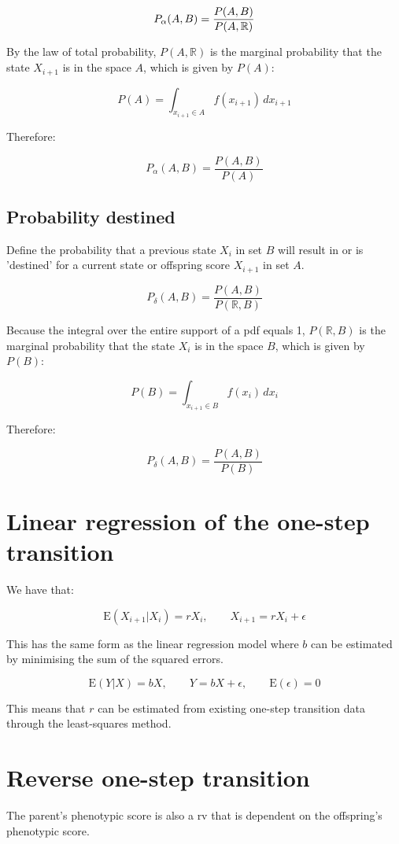 \documentclass[a4paper,11pt]{article}
\begin{document}
$$\large P_{\alpha}(A, B) = \frac{P(A, B)}{P(A, \mathbb{R})}$$

By the law of total probability, $P(A, \mathbb{R})$ is the marginal probability that the state $X_{i+1}$ is in the space $A$, which is given by $P(A)$:

$$P(A) = \int_{x_{i+1}\in A} f(x_{i+1}) \, dx_{i+1}$$

Therefore:

$$P_{\alpha}(A, B) = \frac{P(A, B)}{P(A)}$$




\subsection{Probability destined}
Define the probability that a previous state $X_i$ in set $B$ will result in or is 'destined' for a current state or offspring score $X_{i+1}$ in set $A$. 

$$P_{\delta}(A, B) = \frac{P(A, B)}{P(\mathbb{R}, B)}$$

Because the integral over the entire support of a pdf equals 1, $P(\mathbb{R}, B)$ is the marginal probability that the state $X_i$ is in the space $B$, which is given by $P(B)$:

$$P(B) = \int_{x_{i+1}\in B} f(x_i) \, dx_i$$



Therefore:

$$P_{\delta}(A, B) = \frac{P(A, B)}{P(B)}$$


\section{Linear regression of the one-step transition}

We have that:

$$\mathrm{E}(X_{i+1}|X_i) = rX_i, \qquad X_{i+1} = rX_i + \epsilon$$

This has the same form as the linear regression model where $b$ can be estimated by minimising the sum of the squared errors.

$$\mathrm{E}(Y|X) = bX, \qquad Y = bX + \epsilon, \qquad \mathrm{E}(\epsilon) = 0 $$

This means that $r$ can be estimated from existing one-step transition data through the least-squares method. 


\section{Reverse one-step transition}
The parent's phenotypic score is also a rv that is dependent on the offspring's phenotypic score. 
\end{document}
